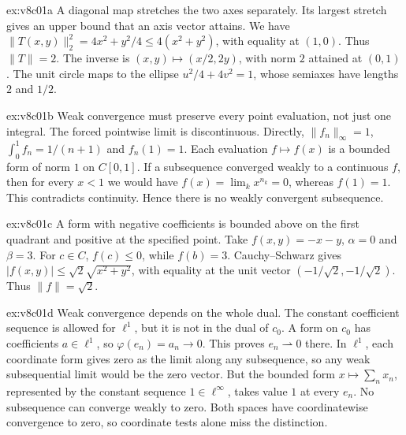 \begin{solution}{ex:v8c01a}
\idea A diagonal map stretches the two axes separately. Its largest stretch gives an upper bound that an axis vector attains.
\writeup We have $\|T(x,y)\|_2^2=4x^2+y^2/4\le4(x^2+y^2)$, with equality at $(1,0)$. Thus $\|T\|=2$. The inverse is $(x,y)\mapsto(x/2,2y)$, with norm $2$ attained at $(0,1)$. The unit circle maps to the ellipse $u^2/4+4v^2=1$, whose semiaxes have lengths $2$ and $1/2$.
\end{solution}
\begin{solution}{ex:v8c01b}
\idea Weak convergence must preserve every point evaluation, not just one integral. The forced pointwise limit is discontinuous.
\writeup Directly, $\|f_n\|_\infty=1$, $\int_0^1f_n=1/(n+1)$ and $f_n(1)=1$. Each evaluation $f\mapsto f(x)$ is a bounded form of norm $1$ on $C[0,1]$. If a subsequence converged weakly to a continuous $f$, then for every $x<1$ we would have $f(x)=\lim_kx^{n_k}=0$, whereas $f(1)=1$. This contradicts continuity. Hence there is no weakly convergent subsequence.
\end{solution}
\begin{solution}{ex:v8c01c}
\idea A form with negative coefficients is bounded above on the first quadrant and positive at the specified point.
\writeup Take $f(x,y)=-x-y$, $\alpha=0$ and $\beta=3$. For $c\in C$, $f(c)\le0$, while $f(b)=3$. Cauchy--Schwarz gives $|f(x,y)|\le\sqrt2\sqrt{x^2+y^2}$, with equality at the unit vector $(-1/\sqrt2,-1/\sqrt2)$. Thus $\|f\|=\sqrt2$.
\end{solution}
\begin{solution}{ex:v8c01d}
\idea Weak convergence depends on the whole dual. The constant coefficient sequence is allowed for $\ell^1$, but it is not in the dual of $c_0$.
\writeup A form on $c_0$ has coefficients $a\in\ell^1$, so $\varphi(e_n)=a_n\to0$. This proves $e_n\rightharpoonup0$ there. In $\ell^1$, each coordinate form gives zero as the limit along any subsequence, so any weak subsequential limit would be the zero vector. But the bounded form $x\mapsto\sum_nx_n$, represented by the constant sequence $1\in\ell^\infty$, takes value $1$ at every $e_n$. No subsequence can converge weakly to zero. Both spaces have coordinatewise convergence to zero, so coordinate tests alone miss the distinction.
\end{solution}

